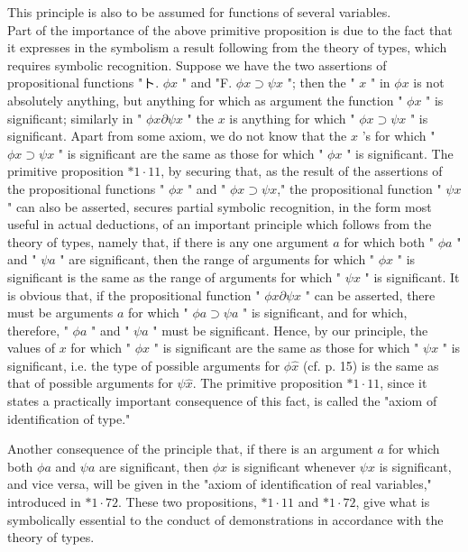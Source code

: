 \documentclass[10pt]{article}
\begin{document}
This principle is also to be assumed for functions of several variables.\\
Part of the importance of the above primitive proposition is due to the fact that it expresses in the symbolism a result following from the theory of types, which requires symbolic recognition. Suppose we have the two assertions of propositional functions "ト. $\phi x$ " and "F. $\phi x \supset \psi x$ "; then the " $x$ " in $\phi x$ is not absolutely anything, but anything for which as argument the function " $\phi x$ " is significant; similarly in " $\phi x \partial \psi x$ " the $x$ is anything for which " $\phi x \supset \psi x$ " is significant. Apart from some axiom, we do not know that the $x$ 's for which " $\phi x \supset \psi x$ " is significant are the same as those for which " $\phi x$ " is significant. The primitive proposition $* 1 \cdot 11$, by securing that, as the result of the assertions of the propositional functions " $\phi x$ " and " $\phi x \supset \psi x$," the propositional function " $\psi x$ " can also be asserted, secures partial symbolic recognition, in the form most useful in actual deductions, of an important principle which follows from the theory of types, namely that, if there is any one argument $a$ for which both " $\phi a$ " and " $\psi a$ " are significant, then the range of arguments for which " $\phi x$ " is significant is the same as the range of arguments for which " $\psi x$ " is significant. It is obvious that, if the propositional function " $\phi x \partial \psi x$ " can be asserted, there must be arguments $a$ for which " $\phi a \supset \psi a$ " is significant, and for which, therefore, " $\phi a$ " and " $\psi a$ " must be significant. Hence, by our principle, the values of $x$ for which " $\phi x$ " is significant are the same as those for which " $\psi x$ " is significant, i.e. the type of possible arguments for $\phi \hat{x}$ (cf. p. 15) is the same as that of possible arguments for $\psi \hat{x}$. The primitive proposition $* 1 \cdot 11$, since it states a practically important consequence of this fact, is called the "axiom of identification of type."

Another consequence of the principle that, if there is an argument $a$ for which both $\phi a$ and $\psi a$ are significant, then $\phi x$ is significant whenever $\psi x$ is significant, and vice versa, will be given in the "axiom of identification of real variables," introduced in $* 1 \cdot 72$. These two propositions, $* 1 \cdot 11$ and $* 1 \cdot 72$, give what is symbolically essential to the conduct of demonstrations in accordance with the theory of types.
\end{document}
